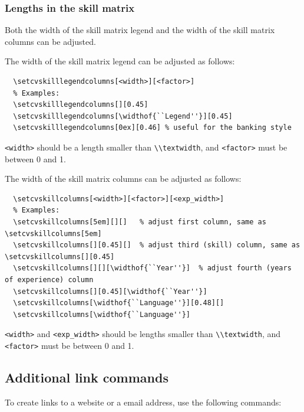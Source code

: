 \documentclass[a4paper, 11pt]{article}
\newcommand{\code}[1]{\lstinline!#1!}
\begin{document}


\subsubsection{Lengths in the skill matrix}
\label{section:length:skillmatrix}
Both the width of the skill matrix legend and the width of the skill matrix columns can be adjusted.

The width of the skill matrix legend can be adjusted as follows:
\begin{lstlisting}
  \setcvskilllegendcolumns[<width>][<factor>]
  % Examples:
  \setcvskilllegendcolumns[][0.45]
  \setcvskilllegendcolumns[\widthof{``Legend''}][0.45]
  \setcvskilllegendcolumns[0ex][0.46] % useful for the banking style
\end{lstlisting}
\code{<width>} should be a length smaller than \code{\\textwidth}, and \code{<factor>} must be between 0 and 1.

The width of the skill matrix columns can be adjusted as follows:
\begin{lstlisting}
  \setcvskillcolumns[<width>][<factor>][<exp_width>]
  % Examples:
  \setcvskillcolumns[5em][][]   % adjust first column, same as \setcvskillcolumns[5em]
  \setcvskillcolumns[][0.45][]  % adjust third (skill) column, same as \setcvskillcolumns[][0.45]
  \setcvskillcolumns[][][\widthof{``Year''}]  % adjust fourth (years of experience) column
  \setcvskillcolumns[][0.45][\widthof{``Year''}]
  \setcvskillcolumns[\widthof{``Language''}][0.48][]
  \setcvskillcolumns[\widthof{``Language''}]
\end{lstlisting}
\code{<width>} and \code{<exp_width>} should be lengths smaller than \code{\\textwidth}, and \code{<factor>} must be between 0 and 1.

\subsection{Additional link commands}%
To create links to a website or a email address, use the following commands:
\end{document}
